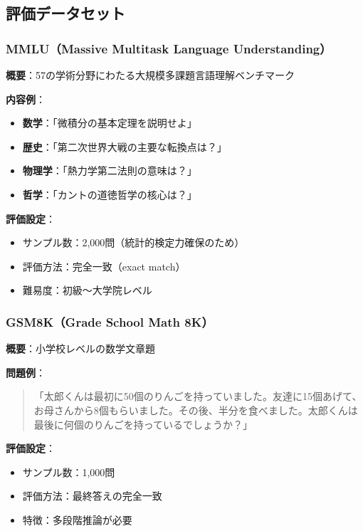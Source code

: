 \documentclass[a4paper,12pt]{jsarticle}
\begin{document}
\subsection{評価データセット}

\subsubsection{MMLU（Massive Multitask Language Understanding）}

\textbf{概要}：57の学術分野にわたる大規模多課題言語理解ベンチマーク

\textbf{内容例}：
\begin{itemize}
\item \textbf{数学}：「微積分の基本定理を説明せよ」
\item \textbf{歴史}：「第二次世界大戦の主要な転換点は？」
\item \textbf{物理学}：「熱力学第二法則の意味は？」
\item \textbf{哲学}：「カントの道徳哲学の核心は？」
\end{itemize}

\textbf{評価設定}：
\begin{itemize}
\item サンプル数：2,000問（統計的検定力確保のため）
\item 評価方法：完全一致（exact match）
\item 難易度：初級〜大学院レベル
\end{itemize}

\subsubsection{GSM8K（Grade School Math 8K）}

\textbf{概要}：小学校レベルの数学文章題

\textbf{問題例}：
\begin{quote}
「太郎くんは最初に50個のりんごを持っていました。友達に15個あげて、お母さんから8個もらいました。その後、半分を食べました。太郎くんは最後に何個のりんごを持っているでしょうか？」
\end{quote}

\textbf{評価設定}：
\begin{itemize}
\item サンプル数：1,000問
\item 評価方法：最終答えの完全一致
\item 特徴：多段階推論が必要
\end{itemize}
\end{document}
